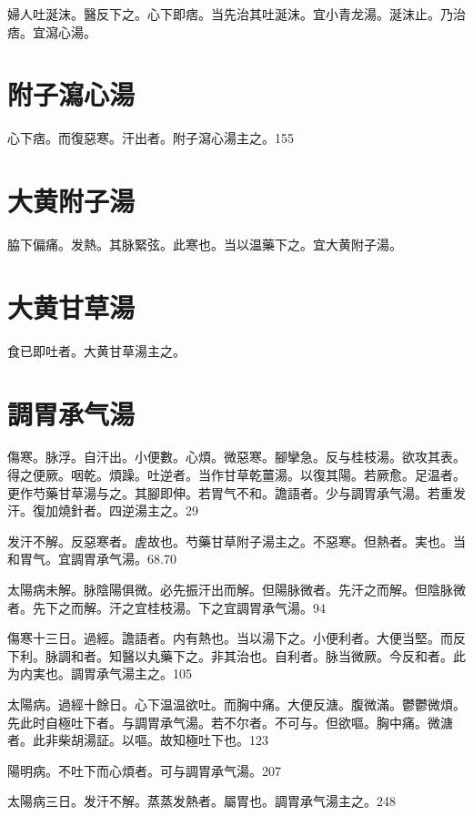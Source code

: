 婦人吐涎沫。醫反下之。心下即痞。当先治其吐涎沫。宜小青龙湯。涎沫止。乃治痞。宜瀉心湯。

\section{附子瀉心湯}

心下痞。而復惡寒。汗出者。附子瀉心湯主之。155

\section{大黄附子湯}

脇下偏痛。{\khaaitp 发熱。}其脉緊弦。此寒也。{\khaaitp 当}以温藥下之。宜大黄附子湯。

\section{大黄甘草湯}

食已即吐者。大黄甘草湯主之。

\section{調胃承气湯}

傷寒。脉浮。自汗出。小便數。心煩。微惡寒。腳攣急。反与桂枝湯。欲攻其表。得之便厥。咽乾。煩躁。吐逆者。当作甘草乾薑湯。以復其陽。若厥愈。足温者。更作芍藥甘草湯与之。其腳即伸。若胃气不和。譫語者。少与{\khaaitp 調胃}承气湯。若重发汗。復加燒針者。四逆湯主之。29

发汗不解。反惡寒者。虗故也。芍藥甘草附子湯主之。不惡寒。但熱者。実也。当和胃气。宜調胃承气湯。68.70

太陽病未解。脉陰陽俱微。必先振汗出而解。但陽{\khaaitp 脉}微者。先汗之而解。但陰{\khaaitp 脉}微者。先下之而解。汗之宜桂枝湯。下之宜{\khaaitp 調胃}承气湯。94

傷寒十三日。過經。譫語者。内有熱也。当以湯下之。小便利者。大便当堅。而反{\khaaitp 下}利。脉調和者。知醫以丸藥下之。非其治也。自利者。脉当微厥。今反和者。此为内実也。{\khaaitp 調胃}承气湯主之。105

太陽病。過經十餘日。心下温温欲吐。而胸中痛。大便反溏。腹微滿。鬱鬱微煩。先{\khaaitp 此}时自極吐下者。与{\khaaitp 調胃}承气湯。若不尔者。不可与。但欲嘔。胸中痛。微溏者。此非柴胡湯証。以嘔。故知極吐下也。123

陽明病。不吐下而{\khaaitp 心}煩者。可与{\khaaitp 調胃}承气湯。207

太陽病三日。发汗不解。蒸蒸发熱者。屬胃也。{\khaaitp 調胃}承气湯主之。248

